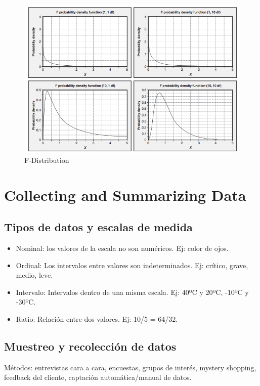 \documentclass[]{article}
\begin{document}
\begin{figure}[ht!]
	\centering
	\includegraphics[width=120mm]{imagenes/F-Distribution.png}
	\caption{F-Distribution}
	\label{fig:F-Distribution}
\end{figure}

\section{Collecting and Summarizing Data}

\subsection{Tipos de datos y escalas de medida}

\begin{itemize}
	\item Nominal: los valores de la escala no son numéricos. Ej: color de ojos.
	\item Ordinal: Los intervalos entre valores son indeterminados. Ej: crítico, grave, medio, leve.
	\item Intervalo: Intervalos dentro de una misma escala. Ej: 40ºC y 20ºC, -10ºC y -30ºC.
	\item Ratio: Relación entre dos valores. Ej: 10/5 = 64/32.
\end{itemize}

\subsection{Muestreo y recolección de datos}

Métodos: entrevistas cara a cara, encuestas, grupos de interés, mystery shopping, feedback del cliente, captación automática/manual de datos.
\end{document}

